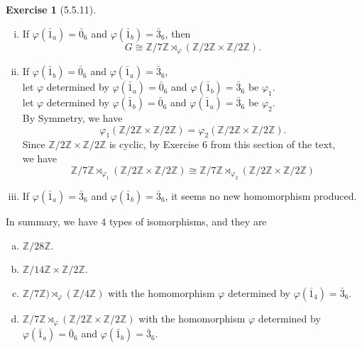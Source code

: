 \documentclass{amsart}
\newcommand{\bbz}{\mathbb{Z}}
\theoremstyle{plain}
\theoremstyle{definition}
\newtheorem{exer}[lem]{Exercise}
\begin{document}
\begin{exer}[5.5.11]
\begin{enumerate}[(a)]
\begin{enumerate}[(i)]
		\item
		  If $\varphi(\bar{1}_a) = \bar{0}_6$ and $\varphi(\bar{1}_b) = \bar{3}_6$, then 
		  \[G \cong \bbz/7\bbz \rtimes_\varphi (\bbz/2\bbz \times \bbz/2\bbz). \]
		\item
		  If $\varphi(\bar{1}_b) = \bar{0}_6$ and $\varphi(\bar{1}_a) = \bar{3}_6$,\\ 
		  let $\varphi$ determined by $\varphi(\bar{1}_a) = \bar{0}_6$ and $\varphi(\bar{1}_b) = \bar{3}_6$ be $\varphi_1$.\\
		  let $\varphi$ determined by $\varphi(\bar{1}_b) = \bar{0}_6$ and $\varphi(\bar{1}_a) = \bar{3}_6$ be $\varphi_2$.\\
		  By Symmetry, we have 
		  \[\varphi_1(\bbz/2\bbz \times \bbz/2\bbz) = \varphi_2(\bbz/2\bbz \times \bbz/2\bbz).\]
		  Since $\bbz/2\bbz \times \bbz/2\bbz$ is cyclic, by Exercise 6 from this section of the text,\\
		  we have 
		  \[\bbz/7\bbz \rtimes_{\varphi_1} (\bbz/2\bbz \times \bbz/2\bbz) \cong \bbz/7\bbz \rtimes_{\varphi_2} (\bbz/2\bbz \times \bbz/2\bbz)\]
		 \item
		  If $\varphi(\bar{1}_a) = \bar{3}_6$ and $\varphi(\bar{1}_b) = \bar{3}_6$, it seems no new homomorphism produced.\\ 
	\end{enumerate}
	In summary, we have 4 types of isomorphisms, and they are
	\begin{enumerate}[(a)]
	\item
	$\bbz/28\bbz$.
	\item
	$\bbz/14\bbz \times \bbz/2\bbz$.
	\item
	$\bbz/7\bbz) \rtimes_\varphi ( \bbz/4\bbz)$ with the homomorphism $\varphi$ determined by $\varphi(\bar{1}_4) = \bar{3}_6$.
	\item
	$\bbz/7\bbz \rtimes_\varphi (\bbz/2\bbz \times \bbz/2\bbz)$ with the homomorphism $\varphi$ determined by $\varphi(\bar{1}_a) = \bar{0}_6$ and $\varphi(\bar{1}_b) = \bar{3}_6$. 

	\end{enumerate}

\end{enumerate}


\end{exer}
\end{document}
